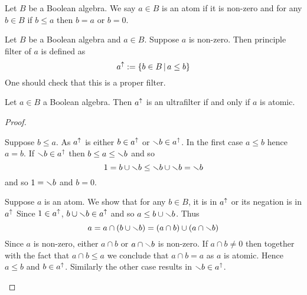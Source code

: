 \begin{dfn}[Atom]
    Let $B$ be a Boolean algebra. 
    We say $a \in B$ is an atom if it is non-zero and for any $b \in B$
    if $b \leq a$ then $b = a$ or $b = 0$.
\end{dfn}

\begin{dfn}
    Let $B$ be a Boolean algebra and $a \in B$.
    Suppose $a$ is non-zero.
    Then principle filter of $a$ is defined as 
    \[a^{\uparrow} := \left\{b \in B \,|\, a \leq b\right\}\]
    One should check that this is a proper filter.
\end{dfn}

\begin{prop}
    Let $a \in B$ a Boolean algebra.
    Then $a^{\uparrow}$ is an ultrafilter if and only if $a$ is atomic. 
\end{prop}
\begin{proof}
    \begin{forward}
        Suppose $b \leq a$.
        As $a^{\uparrow}$ is  
        either $b \in a^{\uparrow}$ or $\smallsetminus b \in a^{\uparrow}$.
        In the first case $a \leq b$ hence $a = b$.
        If $\smallsetminus b \in a^{\uparrow}$ then $b \leq a \leq \smallsetminus b$ and so 
        \[1 = b \cup \smallsetminus b \leq \smallsetminus b \cup \smallsetminus b = \smallsetminus b\]
        and so $1 = \smallsetminus b$ and $b = 0$.
    \end{forward}

    \begin{backward}
        Suppose $a$ is an atom. 
        We show that for any $b \in B$, 
        it is in $a^{\uparrow}$ or its negation is in $a^{\uparrow}$
        Since $1 \in a^{\uparrow}$, 
        $b \cup \smallsetminus b \in a^{\uparrow}$ and so $a \leq b \cup \smallsetminus b$.
        Thus
        \[a = a \cap (b \cup \smallsetminus b) = (a \cap b) \cup (a \cap \smallsetminus b)\]
        Since $a$ is non-zero, either $a \cap b$ or $a \cap \smallsetminus b$ is non-zero.
        If $a \cap b \ne 0$ then together with the fact that $a \cap b \leq a$
        we conclude that $a \cap b = a$ as $a$ is atomic.
        Hence $a \leq b$ and $b \in a^{\uparrow}$.
        Similarly the other case results in $\smallsetminus b \in a^{\uparrow}$.
    \end{backward}
\end{proof}

